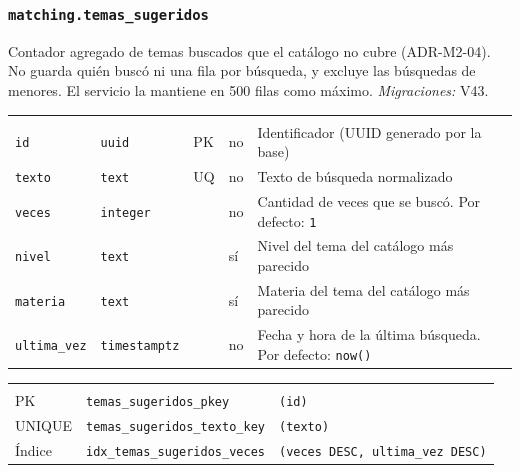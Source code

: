 \subsubsection{\texorpdfstring{\texttt{matching.temas\_\allowbreak{}sugeridos}}{matching.temas\_sugeridos}}\label{dd:matching.temas_sugeridos}

Contador agregado de temas buscados que el catálogo no cubre (ADR-M2-04). No guarda quién buscó ni una fila por búsqueda, y excluye las búsquedas de menores. El servicio la mantiene en 500 filas como máximo. \emph{Migraciones:} V43.

{\small
\begin{xltabular}{\textwidth}{@{}>{\raggedright\arraybackslash}p{3.6cm} >{\raggedright\arraybackslash}p{2.3cm} >{\raggedright\arraybackslash}p{1cm} >{\centering\arraybackslash}p{0.85cm} L@{}}
    \toprule
     &  &  &  &  \\
    \midrule
    \endfirsthead
    \toprule
     &  &  &  &  \\
    \midrule
    \endhead
    \bottomrule
    \endfoot
    \texttt{id} & \texttt{uuid} & PK & no & Identificador (UUID generado por la base) \\
    \texttt{texto} & \texttt{text} & UQ & no & Texto de búsqueda normalizado \\
    \texttt{veces} & \texttt{integer} &  & no & Cantidad de veces que se buscó. Por defecto: \texttt{1} \\
    \texttt{nivel} & \texttt{text} &  & sí & Nivel del tema del catálogo más parecido \\
    \texttt{materia} & \texttt{text} &  & sí & Materia del tema del catálogo más parecido \\
    \texttt{ultima\_\allowbreak{}vez} & \texttt{timestamptz} &  & no & Fecha y hora de la última búsqueda. Por defecto: \texttt{now(\allowbreak{})} \\
\end{xltabular}
}

{\small
\begin{xltabular}{\textwidth}{@{}>{\raggedright\arraybackslash}p{1.7cm} >{\raggedright\arraybackslash}p{4.6cm} L@{}}
    \toprule
     &  &  \\
    \midrule
    \endfirsthead
    \toprule
     &  &  \\
    \midrule
    \endhead
    \bottomrule
    \endfoot
    PK & \texttt{temas\_\allowbreak{}sugeridos\_\allowbreak{}pkey} & \texttt{(\allowbreak{}id)} \\
    UNIQUE & \texttt{temas\_\allowbreak{}sugeridos\_\allowbreak{}texto\_\allowbreak{}key} & \texttt{(\allowbreak{}texto)} \\
    Índice & \texttt{idx\_\allowbreak{}temas\_\allowbreak{}sugeridos\_\allowbreak{}veces} & \texttt{(\allowbreak{}veces DESC,\allowbreak{} ultima\_\allowbreak{}vez DESC)} \\
\end{xltabular}
}

